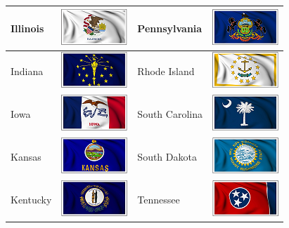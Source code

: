 \documentclass{ximera}
\begin{document}
\begin{center}
\begin{tabular}{|l|l|l|l|}
\hline
Illinois & \includegraphics{pics/StateFlags/Illinois.png} & Pennsylvania & \includegraphics{pics/StateFlags/Pennsylvania.png} \\\hline 
Indiana & \includegraphics{pics/StateFlags/Indiana.png} & Rhode Island & \includegraphics{pics/StateFlags/RhodeIsland.png} \\\hline 
Iowa & \includegraphics{pics/StateFlags/Iowa.png} & South Carolina & \includegraphics{pics/StateFlags/SouthCarolina.png} \\\hline 
Kansas & \includegraphics{pics/StateFlags/Kansas.png} & South Dakota & \includegraphics{pics/StateFlags/SouthDakota.png} \\\hline 
Kentucky & \includegraphics{pics/StateFlags/Kentucky.png} & Tennessee & \includegraphics{pics/StateFlags/Tennessee.png} \\\hline 

\end{tabular}
\end{center}
\end{document}
